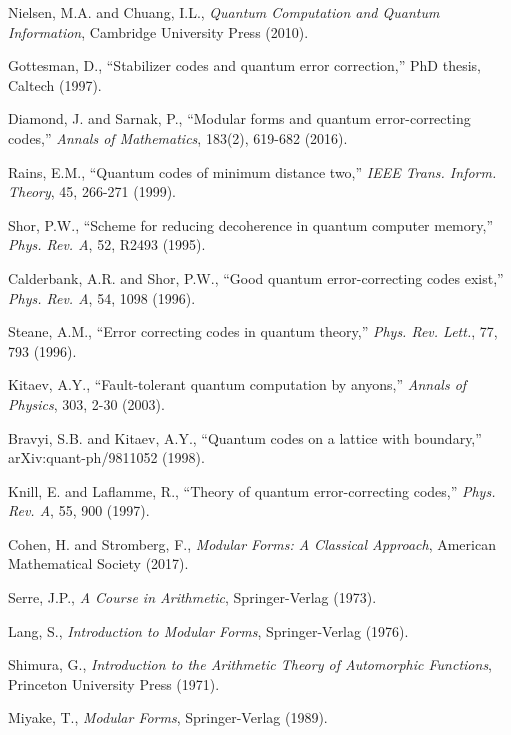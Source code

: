 \documentclass[11pt,a4paper]{article}
\begin{document}
\begin{thebibliography}{99}

 Nielsen, M.A. and Chuang, I.L., \textit{Quantum Computation and Quantum Information}, Cambridge University Press (2010).

 Gottesman, D., ``Stabilizer codes and quantum error correction,'' PhD thesis, Caltech (1997).

 Diamond, J. and Sarnak, P., ``Modular forms and quantum error-correcting codes,'' \textit{Annals of Mathematics}, 183(2), 619-682 (2016).

 Rains, E.M., ``Quantum codes of minimum distance two,'' \textit{IEEE Trans. Inform. Theory}, 45, 266-271 (1999).

 Shor, P.W., ``Scheme for reducing decoherence in quantum computer memory,'' \textit{Phys. Rev. A}, 52, R2493 (1995).

 Calderbank, A.R. and Shor, P.W., ``Good quantum error-correcting codes exist,'' \textit{Phys. Rev. A}, 54, 1098 (1996).

 Steane, A.M., ``Error correcting codes in quantum theory,'' \textit{Phys. Rev. Lett.}, 77, 793 (1996).

 Kitaev, A.Y., ``Fault-tolerant quantum computation by anyons,'' \textit{Annals of Physics}, 303, 2-30 (2003).

 Bravyi, S.B. and Kitaev, A.Y., ``Quantum codes on a lattice with boundary,'' arXiv:quant-ph/9811052 (1998).

 Knill, E. and Laflamme, R., ``Theory of quantum error-correcting codes,'' \textit{Phys. Rev. A}, 55, 900 (1997).

 Cohen, H. and Stromberg, F., \textit{Modular Forms: A Classical Approach}, American Mathematical Society (2017).

 Serre, J.P., \textit{A Course in Arithmetic}, Springer-Verlag (1973).

 Lang, S., \textit{Introduction to Modular Forms}, Springer-Verlag (1976).

 Shimura, G., \textit{Introduction to the Arithmetic Theory of Automorphic Functions}, Princeton University Press (1971).

 Miyake, T., \textit{Modular Forms}, Springer-Verlag (1989).


\end{thebibliography}
\end{document}
